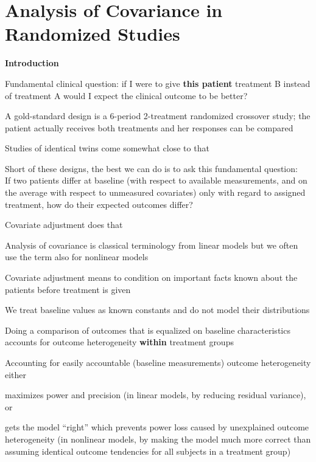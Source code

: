 

\def\apacue{1}
\chapter{Analysis of Covariance in Randomized Studies}

{\smaller[-1] \textbf{Introduction}}

\bi
\item Fundamental clinical question: if I were to give \textbf{this patient} treatment B instead of treatment A would I expect the clinical outcome to be better?
\item A gold-standard design is a 6-period 2-treatment randomized crossover study; the patient actually receives both treatments and her responses can be compared
\item Studies of identical twins come somewhat close to that
\item Short of these designs, the best we can do is to ask this fundamental question: \\ If two patients differ at baseline (with respect to available measurements, and on the average with respect to unmeasured covariates) only with regard to assigned treatment, how do their expected outcomes differ?
\item Covariate adjustment does that
\item Analysis of covariance is classical terminology from linear models but we often use the term also for nonlinear models
\item Covariate adjustment means to condition on important facts known about the patients before treatment is given
\item We treat baseline values as known constants and do not model their distributions
\item Doing a comparison of outcomes that is equalized on baseline characteristics accounts for outcome heterogeneity \textbf{within} treatment groups
\item Accounting for easily accountable (baseline measurements) outcome heterogeneity either
  \bi
  \item maximizes power and precision (in linear models, by reducing residual variance), or
  \item gets the model ``right'' which prevents power loss caused by unexplained outcome heterogeneity (in nonlinear models, by making the model much more correct than assuming identical outcome tendencies for all subjects in a treatment group)
  \ei
\ei

